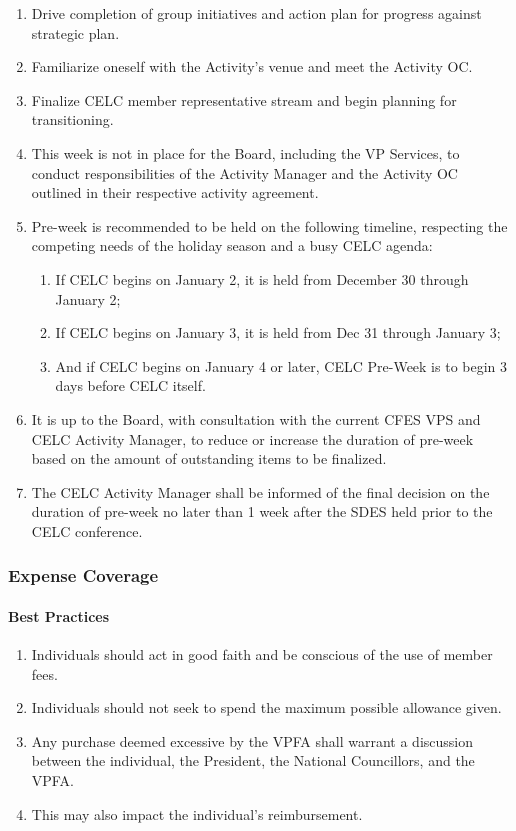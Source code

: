 \begin{enumerate}
 \item
  Drive completion of group initiatives and action plan for progress against strategic plan.
 \item
  Familiarize oneself with the Activity's venue and meet the Activity OC.
 \item
  Finalize CELC member representative stream and begin planning for transitioning.
 \item
  This week is not in place for the Board, including the VP Services, to conduct responsibilities of the Activity Manager and the Activity OC outlined in their respective activity agreement.
 \item
  Pre-week is recommended to be held on the following timeline, respecting the competing needs of the holiday season and a busy CELC agenda:

  \begin{enumerate}
   \item
    If CELC begins on January 2, it is held from December 30 through January 2;
   \item
    If CELC begins on January 3, it is held from Dec 31 through January 3;
   \item
    And if CELC begins on January 4 or later, CELC Pre-Week is to begin 3 days before CELC itself.
  \end{enumerate}

 \item
  It is up to the Board, with consultation with the current CFES VPS and CELC Activity Manager, to reduce or increase the duration of pre-week based on the amount of outstanding items to be finalized.
 \item
  The CELC Activity Manager shall be informed of the final decision on the duration of pre-week no later than 1 week after the SDES held prior to the CELC conference.
\end{enumerate}

\subsubsection{Expense Coverage}
\label{expense-coverage}

\paragraph{Best Practices}
\begin{enumerate}
 \item
  Individuals should act in good faith and be conscious of the use of member fees.
 \item
  Individuals should not seek to spend the maximum possible allowance given.
 \item
  Any purchase deemed excessive by the VPFA shall warrant a discussion between the individual, the President, the National Councillors, and the VPFA.
 \item
  This may also impact the individual's reimbursement.
\end{enumerate}

